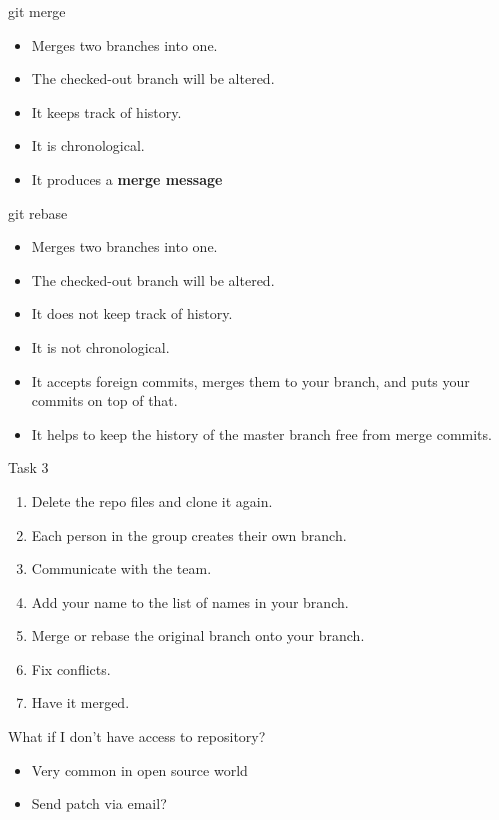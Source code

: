 \documentclass[14pt]{beamer}
\begin{document}
	\begin{frame}{git merge}
	\begin{itemize}
		\item Merges two branches into one.
		\item The checked-out branch will be altered.
		\item It keeps track of history.
		\item It is chronological.
		\item It produces a \textbf{merge message}
	\end{itemize}
\end{frame}

	\begin{frame}{git rebase}
	\begin{itemize}
		\item Merges two branches into one.
		\item The checked-out branch will be altered.
		\item It does not keep track of history.
		\item It is not chronological.
		\item It accepts foreign commits, merges them to your branch, and puts your commits on top of that.
		\item It helps to keep the history of the master branch free from merge commits.
	\end{itemize}
\end{frame}


	\begin{frame}{Task 3}
	\begin{enumerate}
		\item Delete the repo files and clone it again.
		\item Each person in the group creates their own branch.
		\item Communicate with the team.
		\item Add your name to the list of names in your branch.
		\item Merge or rebase the original branch onto your branch.
		\item Fix conflicts.
		\item Have it merged.
	\end{enumerate}
	\end{frame}

	\begin{frame}{What if I don't have access to repository?}
	\begin{itemize}
		\item Very common in open source world
		\item Send patch via email?
	\end{itemize}
	\end{frame}
\end{document}
